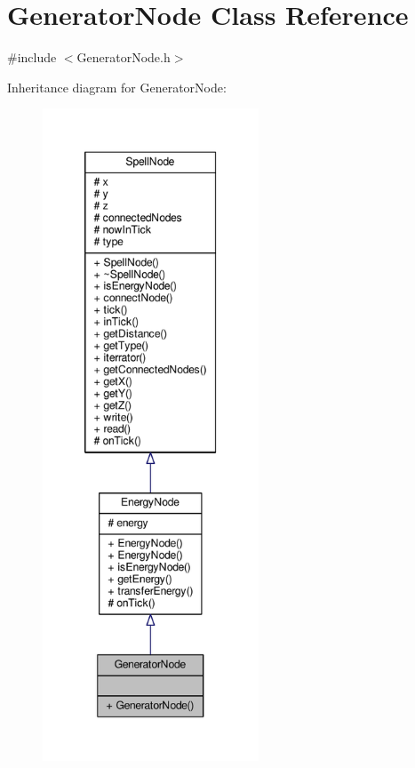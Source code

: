 \hypertarget{class_generator_node}{\section{Generator\-Node Class Reference}
\label{class_generator_node}
}


{\ttfamily \#include $<$Generator\-Node.\-h$>$}



Inheritance diagram for Generator\-Node\-:
\nopagebreak
\begin{figure}[H]
\begin{center}
\leavevmode
\includegraphics[height=550pt]{class_generator_node__inherit__graph}
\end{center}
\end{figure}



